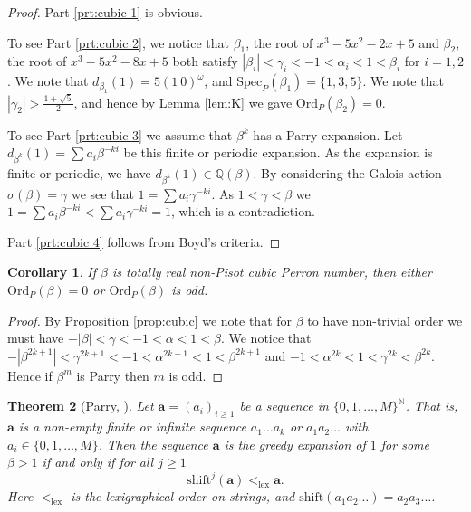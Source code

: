 \documentclass[12pt]{article}
\theoremstyle{plain}
\newtheorem{theorem}{Theorem}[section]
\newtheorem{corollary}[theorem]{Corollary}
\theoremstyle{remark}
\newcommand{\OrdP}{\mathrm{Ord}_{P}}
\newcommand{\SpecP}{\mathrm{Spec}_{P}}
\begin{document}
\begin{proof}
Part \ref{prt:cubic 1} is obvious.

To see Part \ref{prt:cubic 2}, we notice that $\beta_1$, the root of $x^3 - 5 x^2 - 2 x + 5$ and $\beta_2$, the root of $x^3 - 5 x^2 - 8 x + 5$ both satisfy $|\beta_i| < \gamma_i < -1 < \alpha_i < 1 < \beta_i$ for $i = 1, 2$.
We note that $d_{\beta_1}(1) = 5(1\ 0)^\omega$, and $\SpecP(\beta_1) = \{1, 3, 5\}$.
We note that $|\gamma_2| > \frac{1+\sqrt{5}}{2}$, and hence by Lemma \ref{lem:K} we gave $\OrdP(\beta_2) = 0$.

To see Part \ref{prt:cubic 3} we assume that $\beta^k$ has a Parry expansion.  
Let $d_{\beta^k}(1) = \sum a_i \beta^{-ki}$ be this finite or periodic expansion.
As the expansion is finite or periodic, we have $d_{\beta^k}(1) \in \mathbb{Q}(\beta)$.
By considering the Galois action $\sigma(\beta) = \gamma$ we see that 
$1 = \sum a_i \gamma^{-ki}$.
As $1 < \gamma < \beta$ we $1 = \sum a_i \beta^{-ki} < \sum a_i \gamma^{-ki} = 1$, which is a contradiction.

Part \ref{prt:cubic 4} follows from Boyd's criteria.
\end{proof}

\begin{corollary}
    If $\beta$ is totally real non-Pisot cubic Perron number, then either $\OrdP(\beta) = 0$ or $\OrdP(\beta)$ is odd.
\end{corollary}

\begin{proof}
    By Proposition \ref{prop:cubic} we note that for $\beta$ to have non-trivial order we must have $-|\beta| < \gamma < -1 < \alpha < 1 < \beta$.
    We notice that $-|\beta^{2k+1}| < \gamma^{2k+1} < -1 < \alpha^{2k+1} < 1 < \beta^{2k+1}$ and $ -1 < \alpha^{2k} < 1 <  \gamma^{2k} < \beta^{2k}$.
    Hence if $\beta^m$ is Parry then $m$ is odd.
\end{proof}

\begin{theorem}[Parry, \cite{Par60}] \label{thm:parry}
    Let $\mathbf{a}=(a_i)_{i\geq 1}$ be a sequence in $\{0,1,\dots, M\}^{\mathbb{N}}$. That is, $\mathbf{a}$ is a non-empty finite or infinite sequence $a_1\dots a_k$ or $a_1a_2\dots$ with $a_i\in\{0,1,\dots,M\}$. Then the sequence $\mathbf{a}$ is the greedy expansion of $1$ for some $\beta>1$ if and only if for all $j\geq 1$
    $$\mathrm{shift}^j(\mathbf{a})<_{\text{lex}}\mathbf{a}.$$
    Here $<_{\text{lex}}$ is the lexigraphical order on strings, and  
    $\mathrm{shift}(a_1a_2\dots)=a_2a_3\dots$. 
\end{theorem}
\end{document}
